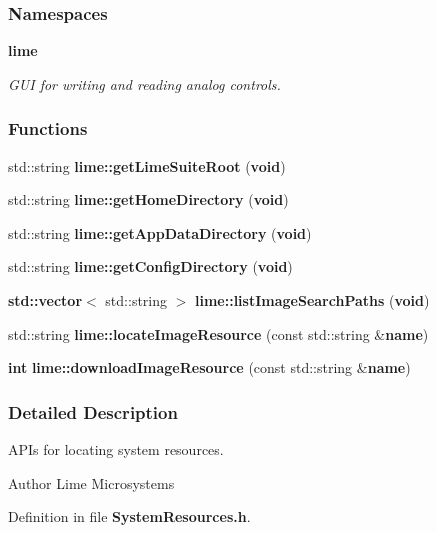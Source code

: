 \subsubsection*{Namespaces}
\begin{DoxyCompactItemize}
\item 
 {\bf lime}
\begin{DoxyCompactList}\small\item\em G\+UI for writing and reading analog controls. \end{DoxyCompactList}\end{DoxyCompactItemize}
\subsubsection*{Functions}
\begin{DoxyCompactItemize}
\item 
std\+::string {\bf lime\+::get\+Lime\+Suite\+Root} ({\bf void})
\item 
std\+::string {\bf lime\+::get\+Home\+Directory} ({\bf void})
\item 
std\+::string {\bf lime\+::get\+App\+Data\+Directory} ({\bf void})
\item 
std\+::string {\bf lime\+::get\+Config\+Directory} ({\bf void})
\item 
{\bf std\+::vector}$<$ std\+::string $>$ {\bf lime\+::list\+Image\+Search\+Paths} ({\bf void})
\item 
std\+::string {\bf lime\+::locate\+Image\+Resource} (const std\+::string \&{\bf name})
\item 
{\bf int} {\bf lime\+::download\+Image\+Resource} (const std\+::string \&{\bf name})
\end{DoxyCompactItemize}


\subsubsection{Detailed Description}
A\+P\+Is for locating system resources. 

\begin{DoxyAuthor}{Author}
Lime Microsystems 
\end{DoxyAuthor}


Definition in file {\bf System\+Resources.\+h}.

